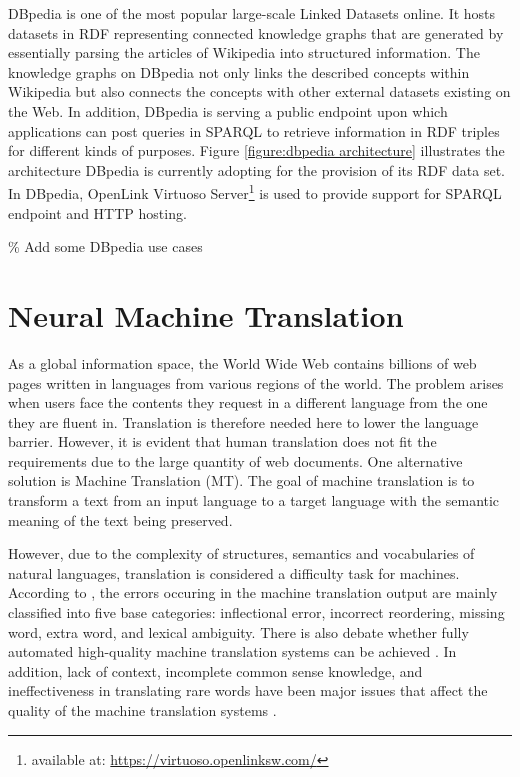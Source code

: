 DBpedia is one of the most popular large-scale Linked Datasets online. It hosts datasets in RDF representing connected knowledge graphs that are generated by essentially parsing the articles of Wikipedia into structured information. The knowledge graphs on DBpedia not only links the described concepts within Wikipedia but also connects the concepts with other external datasets existing on the Web. In addition, DBpedia is serving a public endpoint upon which applications can post queries in SPARQL to retrieve information in RDF triples for different kinds of purposes. Figure \ref{figure:dbpedia architecture} illustrates the architecture DBpedia is currently adopting for the provision of its RDF data set. In DBpedia, OpenLink Virtuoso Server\footnote{available at: \url{https://virtuoso.openlinksw.com/}} is used to provide support for SPARQL endpoint and HTTP hosting.

\% Add some DBpedia use cases





\section{Neural Machine Translation} \label{section:neural machine translation}
As a global information space, the World Wide Web contains billions of web pages written in languages from various regions of the world. The problem arises when users face the contents they request in a different language from the one they are fluent in. Translation is therefore needed here to lower the language barrier. However, it is evident that human translation does not fit the requirements due to the large quantity of web documents. One alternative solution is Machine Translation (MT). The goal of machine translation is to transform a text from an input language to a target language with the semantic meaning of the text being preserved.

However, due to the complexity of structures, semantics and vocabularies of natural languages, translation is considered a difficulty task for machines. According to \cite{Popovic2012}, the errors occuring in the machine translation output are mainly classified into five base categories: inflectional error, incorrect reordering, missing word, extra word, and lexical ambiguity. There is also debate whether fully automated high-quality machine translation systems can be achieved \cite{bar1964language}. In addition, lack of context, incomplete common sense knowledge, and ineffectiveness in translating rare words have been major issues that affect the quality of the machine translation systems \cite{okpor2014machine} \cite{Wu2016}.

